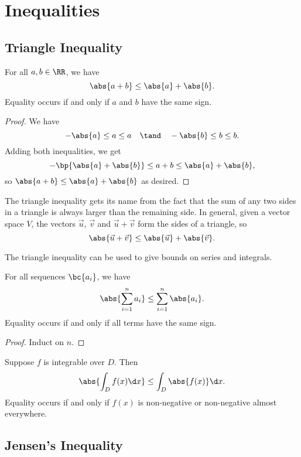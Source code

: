 \chapter{Inequalities}

\section{Triangle Inequality}

\begin{theorem}
    For all $a, b \in \RR$, we have \[\abs{a + b} \leq \abs{a} + \abs{b}.\] Equality occurs if and only if $a$ and $b$ have the same sign.
\end{theorem}
\begin{proof}
    We have \[-\abs{a} \leq a \leq a \quad \tand \quad -\abs{b} \leq b \leq b.\] Adding both inequalities, we get \[-\bp{\abs{a} + \abs{b}} \leq a + b \leq \abs{a} + \abs{b},\] so $\abs{a + b} \leq \abs{a} + \abs{b}$ as desired.
\end{proof}

The triangle inequality gets its name from the fact that the sum of any two sides in a triangle is always larger than the remaining side. In general, given a vector space $V$, the vectors $\vec u$, $\vec v$ and $\vec u + \vec v$ form the sides of a triangle, so \[\abs{\vec u + \vec v} \leq \abs{\vec u} + \abs{\vec v}.\]

The triangle inequality can be used to give bounds on series and integrals.

\begin{corollary}
    For all sequences $\bc{a_i}$, we have \[\abs{\sum_{i = 1}^n a_i} \leq \sum_{i = 1}^n \abs{a_i}.\] Equality occurs if and only if all terms have the same sign.
\end{corollary}
\begin{proof}
    Induct on $n$.
\end{proof}

\begin{corollary}
    Suppose $f$ is integrable over $D$. Then \[\abs{\int_D f(x) \d x} \leq \int_D \abs{f(x)} \d x.\] Equality occurs if and only if $f(x)$ is non-negative or non-negative almost everywhere.
\end{corollary}

\section{Jensen's Inequality}

